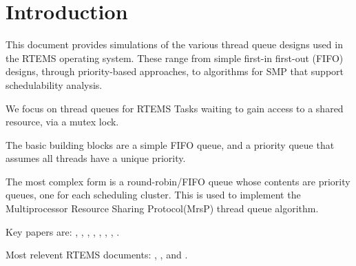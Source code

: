 \section{Introduction}

This document provides simulations of the various thread queue designs used
in the RTEMS operating system. 
These range from simple first-in first-out (FIFO) designs,
through priority-based approaches, 
to algorithms for SMP that support schedulability analysis.

We focus on thread queues for RTEMS Tasks waiting to gain access
to a shared resource, via a mutex lock.

The basic building blocks are a simple FIFO queue, 
and a priority queue that assumes all threads have a unique priority.

The most complex form is a round-robin/FIFO queue 
whose contents are priority queues, 
one for each scheduling cluster.
This is used to implement the 
Multiprocessor Resource Sharing Protocol(MrsP) 
thread queue algorithm.


Key papers are: 
\cite{Burns:2013:MrsP}, 
\cite{Brandenburg:2013:OMIP},
\cite{Catellani:2015:MrsP},
\cite{Garrido:2017:MrsP},
\cite{Zhao:2017:MrsP},
\cite{Gomes:2019:MrsP},
\cite{Zhao:2020:MrsP},
\cite{Zhao:2021:MrsP}
.

Most relevent RTEMS documents:
\cite{RTEMS:CUSER}, 
\cite{RTEMS:ENG}, 
and \cite{RTEMS:USERM}.

